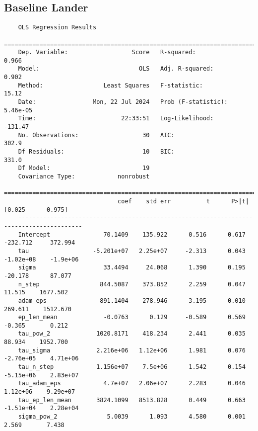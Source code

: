 \scriptsize

\subsection{Baseline Lander}
\label{tab:anova_baseline}
\begin{verbatim}
    OLS Regression Results                            
    ==============================================================================
    Dep. Variable:                  Score   R-squared:                       0.966
    Model:                            OLS   Adj. R-squared:                  0.902
    Method:                 Least Squares   F-statistic:                     15.12
    Date:                Mon, 22 Jul 2024   Prob (F-statistic):           5.46e-05
    Time:                        22:33:51   Log-Likelihood:                -131.47
    No. Observations:                  30   AIC:                             302.9
    Df Residuals:                      10   BIC:                             331.0
    Df Model:                          19                                         
    Covariance Type:            nonrobust                                         
    ========================================================================================
                                coef    std err          t      P>|t|      [0.025      0.975]
    ----------------------------------------------------------------------------------------
    Intercept               70.1409    135.922      0.516      0.617    -232.712     372.994
    tau                  -5.201e+07   2.25e+07     -2.313      0.043   -1.02e+08    -1.9e+06
    sigma                   33.4494     24.068      1.390      0.195     -20.178      87.077
    n_step                 844.5087    373.852      2.259      0.047      11.515    1677.502
    adam_eps               891.1404    278.946      3.195      0.010     269.611    1512.670
    ep_len_mean             -0.0763      0.129     -0.589      0.569      -0.365       0.212
    tau_pow_2             1020.8171    418.234      2.441      0.035      88.934    1952.700
    tau_sigma             2.216e+06   1.12e+06      1.981      0.076   -2.76e+05    4.71e+06
    tau_n_step            1.156e+07    7.5e+06      1.542      0.154   -5.15e+06    2.83e+07
    tau_adam_eps            4.7e+07   2.06e+07      2.283      0.046    1.12e+06    9.29e+07
    tau_ep_len_mean       3824.1099   8513.828      0.449      0.663   -1.51e+04    2.28e+04
    sigma_pow_2              5.0039      1.093      4.580      0.001       2.569       7.438

\end{verbatim}
